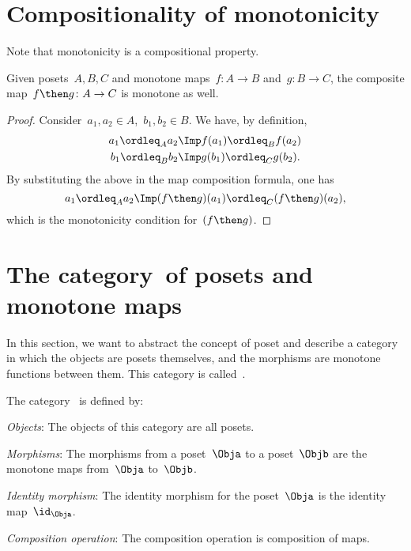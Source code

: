 \section{Compositionality of monotonicity}
Note that monotonicity is a compositional property.
\begin{lemma}
    Given posets~$A, B, C$ and monotone maps~$f\colon A \to B$ and~$g\colon B \to C$, the composite map~$f\then g\colon  A \to C$ is
    monotone as well.
\end{lemma}
\begin{proof}
    Consider~$a_1,a_2 \in A$,~$b_1,b_2\in B$. We have, by definition,
    \begin{equation}
        \begin{aligned}
            a_1\ordleq_A a_2 &\Imp f(a_1)\ordleq_B f(a_2)\\
            b_1\ordleq_B b_2 &\Imp g(b_1)\ordleq_C g(b_2).
        \end{aligned}
    \end{equation}
    By substituting the above in the map composition formula, one has
    \begin{equation}
        a_1\ordleq_A a_2 \Imp (f\then g)(a_1) \ordleq_C (f\then g)(a_2),
    \end{equation}
    which is the monotonicity condition for~$(f\then g)$.
\end{proof}


\section{The category~\Pos of posets and monotone maps}
In this section, we want to abstract the concept of poset and describe a category in which the objects are posets themselves, and the morphisms are monotone functions between them. This category is called~\Pos.

\begin{ctdefinition}
    The category~\iindex{\Pos} is defined by:
    \begin{compactenum}
        \item \emph{Objects}: The objects of this category are all posets.
        \item \emph{Morphisms}: The morphisms from a poset~$\Obja$ to a poset~$\Objb$ are the monotone maps from~$\Obja$ to~$\Objb$.
        \item \emph{Identity morphism}: The identity morphism for the poset~$\Obja$
        is the identity map~$\id_\Obja$.
        \item \emph{Composition operation}: The composition operation is composition of maps.
    \end{compactenum}
\end{ctdefinition}

